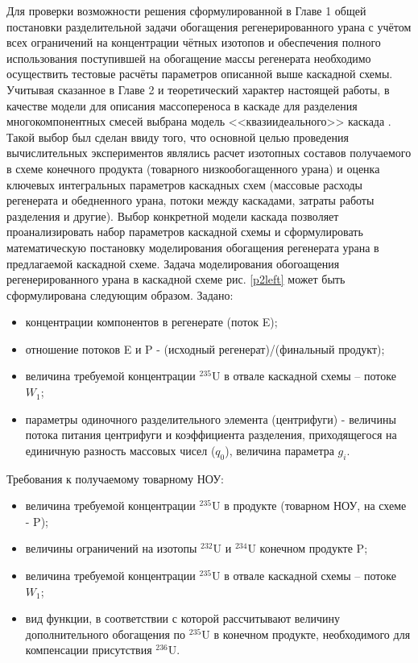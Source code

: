 Для проверки возможности решения сформулированной в Главе 1 общей постановки разделительной задачи обогащения регенерированного урана с учётом всех ограничений на концентрации чётных изотопов и обеспечения полного использования поступившей на обогащение массы регенерата необходимо осуществить тестовые расчёты параметров описанной выше каскадной схемы. 
Учитывая сказанное в Главе 2 и теоретический характер настоящей работы, в качестве модели для описания массопереноса в каскаде для разделения многокомпонентных смесей выбрана модель <<квазиидеального>> каскада \cite{sazykinKvaziidealnyeKaskadyDlya2000}. Такой выбор был сделан ввиду того, что основной целью проведения вычислительных экспериментов являлись расчет изотопных составов получаемого в схеме конечного продукта (товарного низкообогащенного урана) и оценка ключевых интегральных параметров каскадных схем (массовые расходы регенерата и обедненного урана, потоки между каскадами, затраты работы разделения и другие). Выбор конкретной модели каскада позволяет проанализировать набор параметров каскадной схемы и сформулировать математическую постановку моделирования обогащения регенерата урана в предлагаемой каскадной схеме.
Задача моделирования обогоащения регенерированного урана в каскадной схеме рис. \ref{p2left} может быть сформулирована следующим образом.
Задано:

\begin{itemize}
    \item концентрации компонентов в регенерате (поток E); 
    \item отношение потоков E и P - (исходный регенерат)/(финальный продукт);
    \item величина требуемой концентрации $^{235}$U в отвале каскадной схемы – потоке $W_{1}$;
    \item параметры одиночного разделительного элемента (центрифуги) - величины потока питания центрифуги и коэффициента разделения, приходящегося на единичную разность массовых чисел ($q_{0}$), величина параметра $g_{i}$.
\end{itemize}

Требования к получаемому товарному НОУ:

\begin{itemize}
    \item величина требуемой концентрации $^{235}$U в продукте (товарном НОУ, на схеме - P);
    \item величины ограничений на изотопы $^{232}$U и $^{234}$U конечном продукте P;
    \item величина требуемой концентрации $^{235}$U в отвале каскадной схемы – потоке $W_{1}$;
    \item вид функции, в соответствии с которой рассчитывают величину дополнительного обогащения по $^{235}$U в конечном продукте, необходимого для компенсации присутствия $^{236}$U.
\end{itemize}


